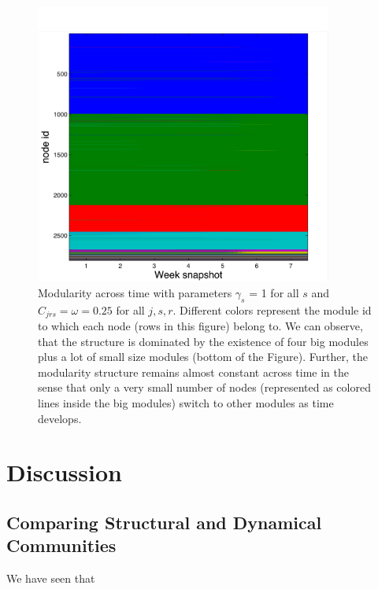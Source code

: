 \documentclass[12pt]{article}
\begin{document}
\begin{figure}[!ht]
	\centering
	\includegraphics[width=0.87\textwidth]{Figures/modularity_time}
	\caption{Modularity across time with parameters
		$\gamma_s$ = 1 for all $s$ and $C_{jrs} = \omega=0.25$ for
		all $j,s,r$.
		 Different colors represent
		the module id to which each node (rows in this figure)
		belong to. We can observe, that the structure is dominated
		by the existence of four big modules plus a lot of small
		size modules (bottom of the Figure). Further, the modularity
		structure remains almost constant across time in the sense
		that only a very small number of nodes (represented as colored
		lines inside the big modules) switch to other modules as
		time develops.}
	\label{fig.time.modular}
\end{figure}

\section{Discussion}

\subsection{Comparing Structural and Dynamical Communities}

We have seen that 
\end{document}
